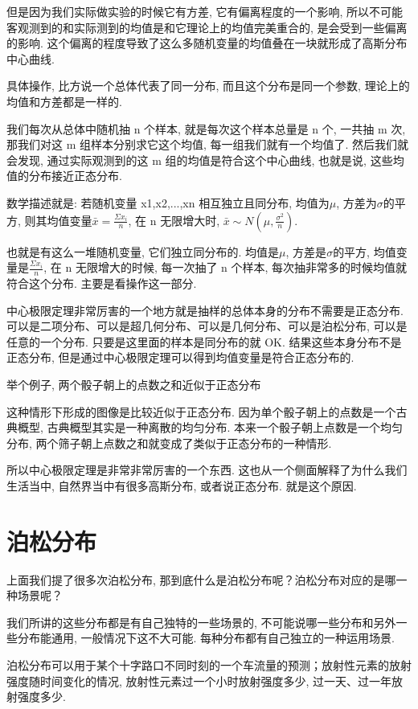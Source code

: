 但是因为我们实际做实验的时候它有方差, 它有偏离程度的一个影响, 所以不可能客观测到的和实际测到的均值是和它理论上的均值完美重合的, 是会受到一些偏离的影响. 这个偏离的程度导致了这么多随机变量的均值叠在一块就形成了高斯分布中心曲线. 

具体操作, 比方说一个总体代表了同一分布, 而且这个分布是同一个参数, 理论上的均值和方差都是一样的. 

我们每次从总体中随机抽 n 个样本, 就是每次这个样本总量是 n 个, 一共抽 m 次, 那我们对这 m 组样本分别求它这个均值, 每一组我们就有一个均值了. 然后我们就会发现, 通过实际观测到的这 m 组的均值是符合这个中心曲线, 也就是说, 这些均值的分布接近正态分布. 

数学描述就是: 若随机变量 x1,x2,...,xn 相互独立且同分布, 均值为$\mu$, 方差为$\sigma$的平方, 则其均值变量$\bar x = \frac{\Sigma x_i}{n}$, 在 n 无限增大时, $\bar x\sim N(\mu, \frac{\sigma^2}{n})$.

也就是有这么一堆随机变量, 它们独立同分布的. 均值是$\mu$, 方差是$\sigma$的平方, 均值变量是$\frac{\Sigma x_i}{n}$, 在 n 无限增大的时候, 每一次抽了 n 个样本, 每次抽非常多的时候均值就符合这个分布. 主要是看操作这一部分. 

中心极限定理非常厉害的一个地方就是抽样的总体本身的分布不需要是正态分布. 可以是二项分布、可以是超几何分布、可以是几何分布、可以是泊松分布, 可以是任意的一个分布. 只要是这里面的样本是同分布的就 OK. 结果这些本身分布不是正态分布, 但是通过中心极限定理可以得到均值变量是符合正态分布的. 

举个例子, 两个骰子朝上的点数之和近似于正态分布

这种情形下形成的图像是比较近似于正态分布. 因为单个骰子朝上的点数是一个古典概型, 古典概型其实是一种离散的均匀分布. 本来一个骰子朝上点数是一个均匀分布, 两个筛子朝上点数之和就变成了类似于正态分布的一种情形. 

所以中心极限定理是非常非常厉害的一个东西. 这也从一个侧面解释了为什么我们生活当中, 自然界当中有很多高斯分布, 或者说正态分布. 就是这个原因. 

\section{泊松分布}

上面我们提了很多次泊松分布, 那到底什么是泊松分布呢？泊松分布对应的是哪一种场景呢？

我们所讲的这些分布都是有自己独特的一些场景的, 不可能说哪一些分布和另外一些分布能通用, 一般情况下这不大可能. 每种分布都有自己独立的一种运用场景. 

泊松分布可以用于某个十字路口不同时刻的一个车流量的预测；放射性元素的放射强度随时间变化的情况, 放射性元素过一个小时放射强度多少, 过一天、过一年放射强度多少. 

